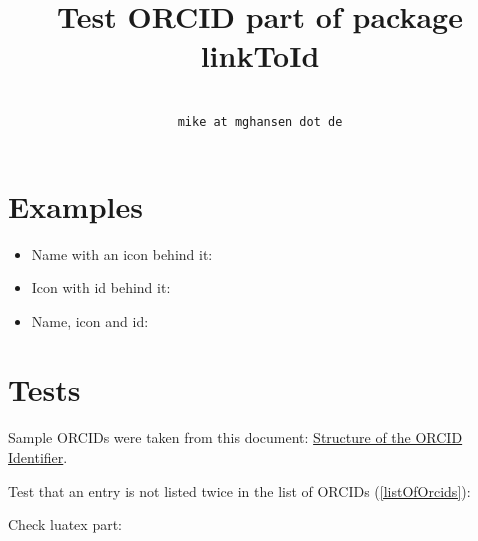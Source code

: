 \documentclass{article}
\newcounter{testsFailed}
\newcounter{testsPassed}
\begin{document}
\title{Test ORCID part of package \textsf{linkToId}}
\author{ \\ \texttt{mike at mghansen dot de}}
\maketitle
\thispagestyle{fancy}

\section{Examples}

\begin{itemize}
\item Name with an icon behind it: 

\item Icon with id behind it: 

\item Name, icon and id: 
\end{itemize}

\section{Tests}

Sample ORCIDs were taken from this document: \href{https://support.orcid.org/knowledgebase/articles/116780-structure-of-the-orcid-identifier}{Structure of the ORCID Identifier}.

Test that an entry is not listed twice in the list of ORCIDs (\ref{listOfOrcids}):  

\ifLinkToIdUseLua

Check luatex part:

\newcommand{\checkValidORCID}[1]{Verify valid ORCID "#1": \ifodd\directlua{linkToId.checkORCIDWrapperBool("#1");} Checksum reported as false!\stepcounter{testsFailed}\else Passed!\stepcounter{testsPassed}\fi}
\newcommand{\checkInvalidORCID}[2]{Detect invalid ORCID "#1" (#2): \ifodd\directlua{linkToId.checkORCIDWrapperBool("#1");} Ok, error detected.\stepcounter{testsPassed}\else \stepcounter{testsFailed}Defect not found!\fi}
\end{document}
